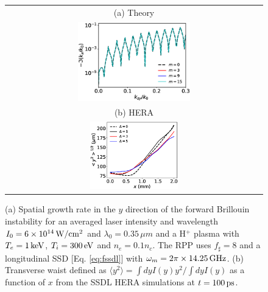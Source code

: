 \documentclass[
 reprint,
 amsmath,amssymb,
 aps,
]{revtex4-1}
\begin{document}
\begin{figure}
\begin{tabular}{c}
(a) Theory\\
\includegraphics[width=0.45\textwidth,trim={-2cm 0 0 0},clip]{SSDL_H+1keV300eV.eps}\\
(b) HERA \\
\includegraphics[width=0.35\textwidth]{FSBS_SSDL_waist_100ps.eps}
\end{tabular}
\caption{ \label{fig:ssdl} 
(a) Spatial growth rate in the $y$ direction of the forward Brillouin instability for an averaged laser intensity and wavelength $I_0=6\times 10^{14}\,\rm W/cm^2$ and  $\lambda_0=0.35\,\mu m$ and a  H$^+$  plasma with $T_e =1\,\rm  keV$, $ T_i=300\,  \rm eV$  and $n_{e}=0.1n_c$.
The RPP uses $f_\sharp = 8$ and a longitudinal  SSD [Eq. \eqref{eq:fssdl}] with  $\omega_m=2\pi \times14.25\,\rm GHz$.
(b) Transverse waist defined as $\langle y^2\rangle=\int dyI(y)y^2 /\int dyI(y)$ as a function of $x$  from the SSDL HERA   simulations at $t=100\,\rm ps$.
}
\end{figure}
\end{document}
